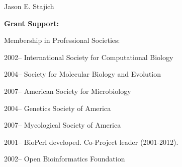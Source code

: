 \documentclass[10pt]{article}
\begin{document}
\begin{cv}{\centerline{Jason E. Stajich}}
\begin{cvlistcompact}{\bf Grant Support:}
\begin{cvlistcompact}{Membership in Professional Societies:}
\item [2002--] International Society for Computational Biology
\item [2004--] Society for Molecular Biology and Evolution
\item [2007--] American Society for Microbiology
\item [2004--] Genetics Society of America 
\item [2007--] Mycological Society of America 
\item [2001--] BioPerl developed. Co-Project leader (2001-2012).
\item [2002--] Open Bioinformatics Foundation 
\end{cvlistcompact}



\end{cvlistcompact}
\end{cv}
\end{document}
